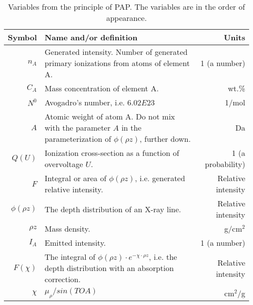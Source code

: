 \begin{table}[phtb]
    \begin{center}
        \caption{
            Variables from the principle of PAP.
            The variables are in the order of appearance.
        }
        \label{tab:quantitative:PAP:variables:principle}
        \begin{tabular}{rp{9cm}r}
            \hline
            \textbf{Symbol} & \textbf{Name and/or definition}                                                                                          & \textbf{Units}     \\

            \hline
            $n_A$           & Generated intensity. Number of generated primary ionizations from atoms of element A.                                    & 1 (a number)       \\
            $C_A$           & Mass concentration of element A.                                                                                         & wt.\%              \\
            $N^0$           & Avogadro's number, i.e. $6.02E23$                                                                                        & 1/mol              \\
            $A$             & Atomic weight of atom A. Do not mix with the parameter $A$ in the parameterization of $\phi(\rho z)$, further down.      & Da                 \\
            $Q(U)$          & Ionization cross-section as a function of overvoltage $U$.                                                               & 1 (a probability)  \\
            $F$             & Integral or area of $\phi(\rho z)$, i.e. generated relative intensity.                                                   & Relative intensity \\
            $\phi(\rho z)$  & The depth distribution of an X-ray line.                                                                                 & Relative intensity \\
            $\rho z$        & Mass density.                                                                                                            & g/cm$^2$           \\
            $I_A$           & Emitted intensity.                                                                                                       & 1 (a number)       \\
            $F(\chi)$       & The integral of $\phi (\rho z) \cdot e^{-\chi \cdot \rho z}$, i.e. the depth distribution with an absorption correction. & Relative intensity \\
            $\chi$          & $ \mu_\rho / sin(TOA) $                                                                                                  & cm$^2$/g           \\
            \hline
        \end{tabular}
    \end{center}
\end{table}
